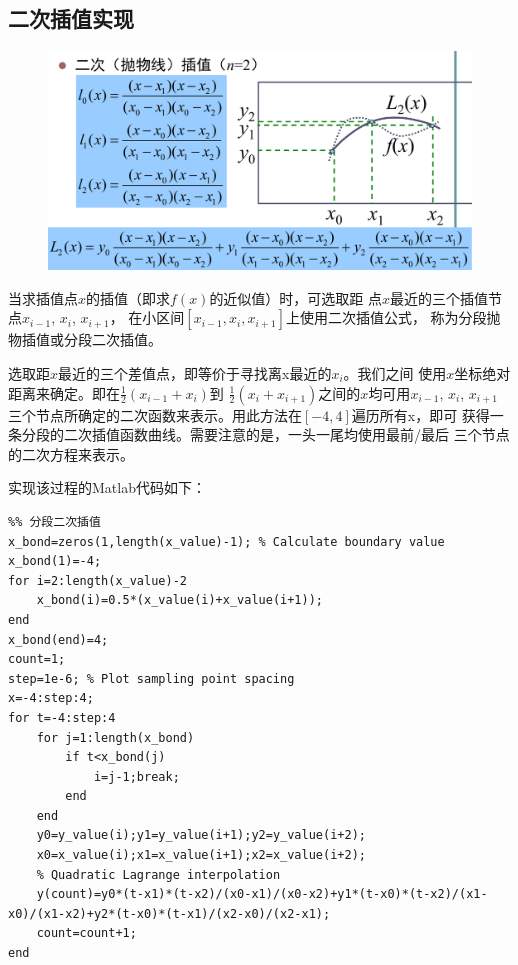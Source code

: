 \documentclass[a4paper,12pt]{ctexart}
\begin{document}
\subsection{二次插值实现}
\begin{figure}[H]
    \centering
    \includegraphics[width=13cm]{上机4/ercichazhi.png}
\end{figure}
\par
当求插值点$x$的插值（即求$f(x)$的近似值）时，可选取距
点$x$最近的三个插值节点$x_{i-1}$, $x_i$, $x_{i+1}$，
在小区间$[x_{i-1},x_i,x_{i+1}]$上使用二次插值公式，
称为分段抛物插值或分段二次插值。
\par
选取距$x$最近的三个差值点，即等价于寻找离x最近的$x_i$。我们之间
使用$x$坐标绝对距离来确定。即在$\frac{1}{2}(x_{i-1}+x_i)$到
$\frac{1}{2}(x_i+x_{i+1})$之间的$x$均可用$x_{i-1}$, $x_i$, $x_{i+1}$
三个节点所确定的二次函数来表示。用此方法在$[-4,4]$遍历所有x，即可
获得一条分段的二次插值函数曲线。需要注意的是，一头一尾均使用最前/最后
三个节点的二次方程来表示。
\par
实现该过程的Matlab代码如下：
\begin{lstlisting}
%% 分段二次插值
x_bond=zeros(1,length(x_value)-1); % Calculate boundary value
x_bond(1)=-4;
for i=2:length(x_value)-2
    x_bond(i)=0.5*(x_value(i)+x_value(i+1));
end
x_bond(end)=4;
count=1;
step=1e-6; % Plot sampling point spacing
x=-4:step:4;
for t=-4:step:4
    for j=1:length(x_bond)
        if t<x_bond(j)
            i=j-1;break;
        end
    end
    y0=y_value(i);y1=y_value(i+1);y2=y_value(i+2);
    x0=x_value(i);x1=x_value(i+1);x2=x_value(i+2);
    % Quadratic Lagrange interpolation
    y(count)=y0*(t-x1)*(t-x2)/(x0-x1)/(x0-x2)+y1*(t-x0)*(t-x2)/(x1-x0)/(x1-x2)+y2*(t-x0)*(t-x1)/(x2-x0)/(x2-x1);
    count=count+1;
end
\end{lstlisting}
\end{document}
